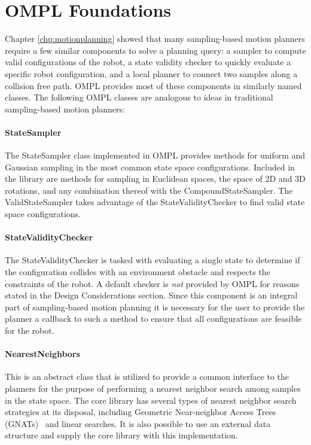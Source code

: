 \section {OMPL Foundations}
Chapter \ref{chp:motionplanning} showed that many sampling-based motion planners
require a few similar components to solve a planning query: a sampler to compute
valid configurations of the robot, a state validity checker to quickly evaluate
a specific robot configuration, and a local planner to connect two samples along
a collision free path.  OMPL provides most of these components in similarly
named classes.  The following OMPL classes are analogous to ideas in traditional
sampling-based motion planners:

\paragraph {StateSampler} The StateSampler class implemented in OMPL
provides methods for uniform and Gaussian sampling in the most common state
space configurations.  Included in the library are methods for sampling
in Euclidean spaces, the space of 2D and 3D rotations, and any combination
thereof with the CompoundStateSampler.  The ValidStateSampler takes advantage
of the StateValidityChecker to find valid state space configurations.

\paragraph {StateValidityChecker} The StateValidityChecker is tasked with
evaluating a single state to determine if the configuration collides with an
environment obstacle and respects the constraints of the robot.  A default
checker is \emph{not} provided by OMPL for reasons stated in the Design
Considerations section.  Since this component is an integral part of
sampling-based motion planning it is necessary for the user to provide the
planner a callback to such a method to ensure that all configurations are
feasible for the robot.

\paragraph {NearestNeighbors} This is an abstract class that is utilized
to provide a common interface to the planners for the purpose of performing a
nearest neighbor search among samples in the state space.  The core library
has several types of nearest neighbor search strategies at its disposal,
including Geometric Near-neighbor Access Trees (GNATs)~\cite{Brin:1995}
and linear searches.
It is also possible to use an external data structure and supply the core library
with this implementation.

